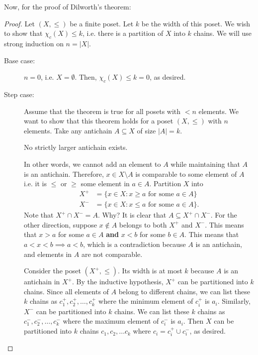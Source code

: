 \documentclass[a4paper]{article}
\begin{document}
Now, for the proof of Dilworth's theorem:

\begin{proof}
	Let \( (X, \le ) \) be a finite poset. Let \( k \) be the width of this poset. We wish to show that \( \chi_c(X) \le k \), i.e. there is a partition of \( X \) into \( k \) chains. We will use strong induction on \( n = |X|\).
	\begin{description}
		\item[Base case:] \( n=0 \), i.e. \( X = \emptyset \). Then, \( \chi_c(X) \le k = 0 \), as desired.
		\item[Step case:] Assume that the theorem is true for all posets with \( <n \) elements. We want to show that this theorem holds for a poset \( (X,\le ) \) with \( n \) elements. Take any antichain \( A \subseteq X \) of size \( |A|=k \).
			\begin{observe}
				No strictly larger antichain exists.
			\end{observe}
			In other words, we cannot add an element to \( A \) while maintaining that \( A \) is an antichain. Therefore, \( x \in X\setminus A \) is comparable to some element of \( A \) i.e. it is \( \le  \) or \( \ge  \) some element in \( a \in A \). Partition \( X \) into 
			\begin{align*}
				X^+ &= \{x \in X \colon x \ge a \text{ for some } a \in A\}  \\
				X^- &= \{x \in X \colon x \le a \text{ for some } a \in A\}  
			.\end{align*}
			Note that \( X^+ \cap X^- = A \). Why? It is clear that \( A \subseteq X^+\cap X^- \). For the other direction, suppose \( x \not\in A \) belongs to both \( X^+ \) and \( X^- \). This means that \( x > a \) for some \( a \in A \) \textbf{and} \( x<b \) for some \( b \in A \). This means that \( a<x<b \implies a<b \), which is a contradiction because \( A \) is an antichain, and elements in \( A \) are not comparable.

			Consider the poset \( (X^+, \le) \). Its width is at most \( k \) because \( A \) is an antichain in \( X^+ \). By the inductive hypothesis, \( X^+ \) can be partitioned into \( k \) chains. Since all elements of \( A \) belong to different chains, we can list these \( k \) chains as \( c_{1}^+,c_{2}^+,\ldots ,c_k^+ \) where the minimum element of \( c_i^+ \) is \( a_i \). Similarly, \( X^- \) can be partitioned into \( k \) chains. We can list these \( k \) chains as \( c_{1}^-,c_{2}^-, \ldots , c_k^- \) where the maximum element of \( c_i^- \) is \( a_i \). Then \( X \) can be partitioned into \( k \) chains \( c_{1},c_{2},\ldots c_k \) where \( c_i=c_i^+ \cup c_i^- \), as desired.


\end{description}
\end{proof}
\end{document}
